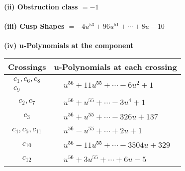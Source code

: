 \documentclass[1p]{elsarticle_modified}
\theoremstyle{definition}
\begin{document}
\flushleft \textbf{(ii) Obstruction class $= -1$}\\~\\
\flushleft \textbf{(iii) Cusp Shapes $= -4 u^{53}+96 u^{51}+\cdots+8 u-10$}\\~\\
\newpage\renewcommand{\arraystretch}{1}
\flushleft \textbf{(iv) u-Polynomials at the component}\newline \\
\begin{tabular}{m{50pt}|m{274pt}}
Crossings & \hspace{64pt}u-Polynomials at each crossing \\
\hline $$\begin{aligned}c_{1},c_{6},c_{8}\\c_{9}\end{aligned}$$&$\begin{aligned}
&u^{56}+11 u^{55}+\cdots-6 u^2+1
\end{aligned}$\\
\hline $$\begin{aligned}c_{2},c_{7}\end{aligned}$$&$\begin{aligned}
&u^{56}+u^{55}+\cdots-3 u^4+1
\end{aligned}$\\
\hline $$\begin{aligned}c_{3}\end{aligned}$$&$\begin{aligned}
&u^{56}+u^{55}+\cdots-326 u+137
\end{aligned}$\\
\hline $$\begin{aligned}c_{4},c_{5},c_{11}\end{aligned}$$&$\begin{aligned}
&u^{56}- u^{55}+\cdots+2 u+1
\end{aligned}$\\
\hline $$\begin{aligned}c_{10}\end{aligned}$$&$\begin{aligned}
&u^{56}-11 u^{55}+\cdots-3504 u+329
\end{aligned}$\\
\hline $$\begin{aligned}c_{12}\end{aligned}$$&$\begin{aligned}
&u^{56}+3 u^{55}+\cdots+6 u-5
\end{aligned}$\\
\hline
\end{tabular}\\~\\
\end{document}

